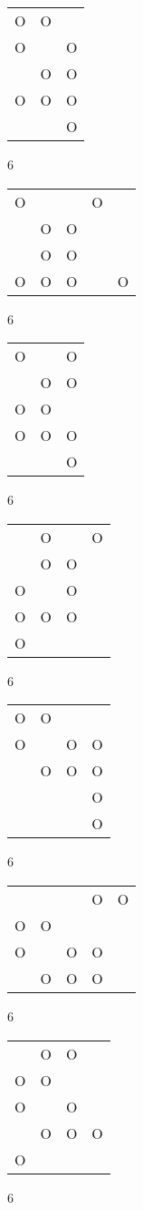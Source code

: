 \begin{tabular}{|m{0.2cm}m{0.2cm}m{0.2cm}|}\hline
O&O& \\
O& &O\\
 &O&O\\
O&O&O\\
 & &O\\
\hline\end{tabular}6
\begin{tabular}{|m{0.2cm}m{0.2cm}m{0.2cm}m{0.2cm}m{0.2cm}|}\hline
O& & &O& \\
 &O&O& & \\
 &O&O& & \\
O&O&O& &O\\
\hline\end{tabular}6
\begin{tabular}{|m{0.2cm}m{0.2cm}m{0.2cm}|}\hline
O& &O\\
 &O&O\\
O&O& \\
O&O&O\\
 & &O\\
\hline\end{tabular}6
\begin{tabular}{|m{0.2cm}m{0.2cm}m{0.2cm}m{0.2cm}|}\hline
 &O& &O\\
 &O&O& \\
O& &O& \\
O&O&O& \\
O& & & \\
\hline\end{tabular}6
\begin{tabular}{|m{0.2cm}m{0.2cm}m{0.2cm}m{0.2cm}|}\hline
O&O& & \\
O& &O&O\\
 &O&O&O\\
 & & &O\\
 & & &O\\
\hline\end{tabular}6
\begin{tabular}{|m{0.2cm}m{0.2cm}m{0.2cm}m{0.2cm}m{0.2cm}|}\hline
 & & &O&O\\
O&O& & & \\
O& &O&O& \\
 &O&O&O& \\
\hline\end{tabular}6
\begin{tabular}{|m{0.2cm}m{0.2cm}m{0.2cm}m{0.2cm}|}\hline
 &O&O& \\
O&O& & \\
O& &O& \\
 &O&O&O\\
O& & & \\
\hline\end{tabular}6
